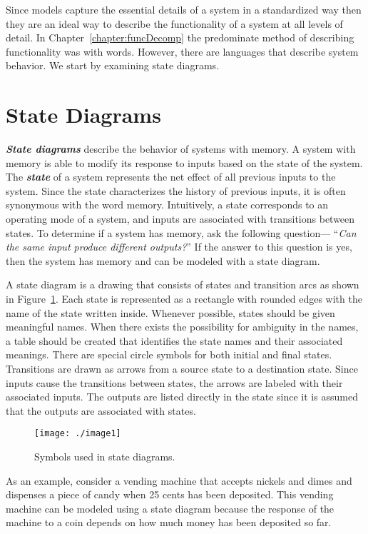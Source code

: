 Since models capture the essential details of a system in a standardized
way then they are an ideal way to describe the functionality of a system
at all levels of detail. In 
Chapter~\ref{chapter:funcDecomp} the predominate method of
describing functionality was with words. However, there are languages
that describe system behavior. We start by examining state diagrams.

\section{State Diagrams}
\label{section:state-diagrams}

\emph{\textbf{State diagrams}} describe the behavior of systems with
memory. A system with memory is able to modify its response to inputs
based on the state of the system. The \emph{\textbf{state}} of a system
represents the net effect of all previous inputs to the system. Since
the state characterizes the history of previous inputs, it is often
synonymous with the word memory. Intuitively, a state corresponds to an
operating mode of a system, and inputs are associated with transitions
between states. To determine if a system has memory, ask the following
question--- ``\emph{Can the same input produce different outputs?}'' If
the answer to this question is yes, then the system has memory and can
be modeled with a state diagram.

A state diagram is a drawing that consists of states and transition arcs
as shown in Figure~\ref{figure:stateDiagramSymbols}. 
Each state is represented as a rectangle with
rounded edges with the name of the state written inside. Whenever
possible, states should be given meaningful names. When there exists the
possibility for ambiguity in the names, a table should be created that
identifies the state names and their associated meanings. There are
special circle symbols for both initial and final states. Transitions
are drawn as arrows from a source state to a destination state. Since
inputs cause the transitions between states, the arrows are labeled with
their associated inputs. The outputs are listed directly in the state
since it is assumed that the outputs are associated with states.


\begin{figure}[h]
\centering
\texttt{[image: ./image1]}
\caption{Symbols used in state diagrams.}
\label{figure:stateDiagramSymbols}
\end{figure}


As an example, consider a vending machine that accepts nickels and dimes
and dispenses a piece of candy when 25 cents has been deposited. This
vending machine can be modeled using a state diagram because the
response of the machine to a coin depends on how much money has been
deposited so far.

